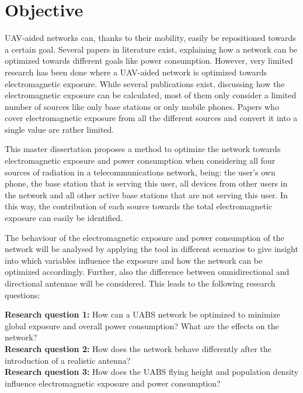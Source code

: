 \section{Objective}
\label{sec:objective}

\gls{UAV}-aided networks can, thanks to their mobility, easily be repositioned towards a certain goal. Several papers 
in literature exist, explaining how a network can be optimized towards different goals like power consumption.
However, very limited
research has been done where a \gls{UAV}-aided network is optimized towards electromagnetic exposure.
While several publications exist, discussing how the electromagnetic exposure can be calculated, most of them only consider a limited number of sources like only base stations or only mobile phones.
Papers who cover electromagnetic exposure from all the different sources and convert it into a single value are rather limited.

This master dissertation proposes a method to optimize the network towards electromagnetic exposure and power consumption
when considering all four sources of radiation in a telecommunications network, being: the user's own phone, 
the base station that is serving this user, 
all devices from other users in the network and all 
other active base stations that are not serving this user. In this way, the contribution of each source towards the total 
electromagnetic exposure can easily be identified. 

The behaviour of the electromagnetic exposure and power consumption of the network will be analysed by applying the tool in different scenarios 
to give insight into which variables influence the exposure and how
the network can be optimized accordingly. Further, also the difference between omnidirectional and directional antennae will 
be considered. This leads to the following research questions:

\textbf{Research question 1:} How can a \gls{UABS} network be optimized to minimize global exposure and overall power consumption? 
What are the effects on the network?\\

\textbf{Research question 2:} How does the network behave differently after the introduction of a realistic antenna?\\

\textbf{Research question 3:} How does the \gls{UABS} flying height and population density influence electromagnetic 
exposure and power consumption?\\

